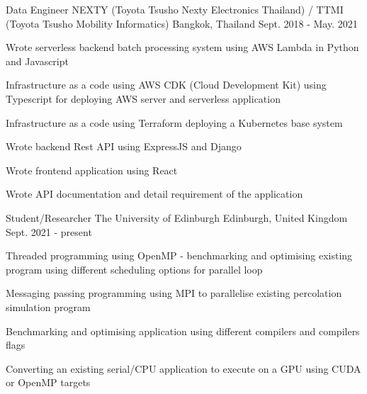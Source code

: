 \begin{cventries}
  \cventry
    {Data Engineer} %
    {NEXTY (Toyota Tsusho Nexty Electronics Thailand) / TTMI (Toyota Tsusho Mobility Informatics)} %
    {Bangkok, Thailand} %
    {Sept. 2018 - May. 2021} %
    {
      \begin{cvitems} %
        \item {Wrote serverless backend batch processing system using AWS Lambda in Python and Javascript}
        \item {
          Infrastructure as a code using AWS CDK (Cloud Development Kit) using
          Typescript for deploying AWS server and serverless application
        }
        \item {Infrastructure as a code using Terraform deploying a Kubernetes base system}
        \item {Wrote backend Rest API using ExpressJS and Django}
        \item {Wrote frontend application using React}
        \item {Wrote API documentation and detail requirement of the application}
      \end{cvitems}
    }
  \cventry
  {Student/Researcher} %
  {The University of Edinburgh} %
  {Edinburgh, United Kingdom} %
  {Sept. 2021 - present} %
  {
    \begin{cvitems} %
      \item {Threaded programming using OpenMP - benchmarking and optimising existing program using different scheduling options for parallel loop}
      \item {Messaging passing programming using MPI to parallelise existing percolation simulation program}
      \item {Benchmarking and optimising application using different compilers and compilers flags}
      \item {Converting an existing serial/CPU application to execute on a GPU using CUDA or OpenMP targets}
    \end{cvitems}
  }
\end{cventries}
